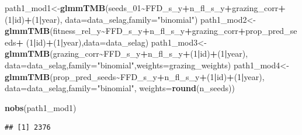 \documentclass[
]{article}
\newenvironment{Shaded}{\begin{snugshade}}{\end{snugshade}}
\newcommand{\DataTypeTok}[1]{\textcolor[rgb]{0.13,0.29,0.53}{#1}}
\newcommand{\DecValTok}[1]{\textcolor[rgb]{0.00,0.00,0.81}{#1}}
\newcommand{\KeywordTok}[1]{\textcolor[rgb]{0.13,0.29,0.53}{\textbf{#1}}}
\newcommand{\NormalTok}[1]{#1}
\newcommand{\OperatorTok}[1]{\textcolor[rgb]{0.81,0.36,0.00}{\textbf{#1}}}
\newcommand{\StringTok}[1]{\textcolor[rgb]{0.31,0.60,0.02}{#1}}
\begin{document}
\begin{Shaded}
\begin{Highlighting}[]
\NormalTok{path1\_mod1\textless{}{-}}\KeywordTok{glmmTMB}\NormalTok{(seeds\_}\DecValTok{01}\OperatorTok{\textasciitilde{}}\NormalTok{FFD\_s\_y}\OperatorTok{+}\NormalTok{n\_fl\_s\_y}\OperatorTok{+}\NormalTok{grazing\_corr}\OperatorTok{+}\NormalTok{(}\DecValTok{1}\OperatorTok{|}\NormalTok{id)}\OperatorTok{+}\NormalTok{(}\DecValTok{1}\OperatorTok{|}\NormalTok{year),}
                \DataTypeTok{data=}\NormalTok{data\_selag,}\DataTypeTok{family=}\StringTok{"binomial"}\NormalTok{)}
\NormalTok{path1\_mod2\textless{}{-}}\KeywordTok{glmmTMB}\NormalTok{(fitness\_rel\_y}\OperatorTok{\textasciitilde{}}\NormalTok{FFD\_s\_y}\OperatorTok{+}\NormalTok{n\_fl\_s\_y}\OperatorTok{+}\NormalTok{grazing\_corr}\OperatorTok{+}\NormalTok{prop\_pred\_seeds}\OperatorTok{+}
\StringTok{                   }\NormalTok{(}\DecValTok{1}\OperatorTok{|}\NormalTok{id)}\OperatorTok{+}\NormalTok{(}\DecValTok{1}\OperatorTok{|}\NormalTok{year),}\DataTypeTok{data=}\NormalTok{data\_selag)}
\NormalTok{path1\_mod3\textless{}{-}}\KeywordTok{glmmTMB}\NormalTok{(grazing\_corr}\OperatorTok{\textasciitilde{}}\NormalTok{FFD\_s\_y}\OperatorTok{+}\NormalTok{n\_fl\_s\_y}\OperatorTok{+}\NormalTok{(}\DecValTok{1}\OperatorTok{|}\NormalTok{id)}\OperatorTok{+}\NormalTok{(}\DecValTok{1}\OperatorTok{|}\NormalTok{year),}
                  \DataTypeTok{data=}\NormalTok{data\_selag,}\DataTypeTok{family=}\StringTok{"binomial"}\NormalTok{,}\DataTypeTok{weights=}\NormalTok{grazing\_weights)}
\NormalTok{path1\_mod4\textless{}{-}}\KeywordTok{glmmTMB}\NormalTok{(prop\_pred\_seeds}\OperatorTok{\textasciitilde{}}\NormalTok{FFD\_s\_y}\OperatorTok{+}\NormalTok{n\_fl\_s\_y}\OperatorTok{+}\NormalTok{(}\DecValTok{1}\OperatorTok{|}\NormalTok{id)}\OperatorTok{+}\NormalTok{(}\DecValTok{1}\OperatorTok{|}\NormalTok{year),}
                  \DataTypeTok{data=}\NormalTok{data\_selag,}\DataTypeTok{family=}\StringTok{"binomial"}\NormalTok{,}
                  \DataTypeTok{weights=}\KeywordTok{round}\NormalTok{(n\_seeds))}
\end{Highlighting}
\end{Shaded}

\begin{Shaded}
\begin{Highlighting}[]
\KeywordTok{nobs}\NormalTok{(path1\_mod1)}
\end{Highlighting}
\end{Shaded}

\begin{verbatim}
## [1] 2376
\end{verbatim}
\end{document}
